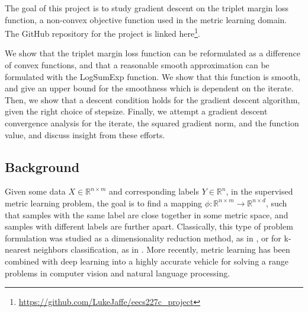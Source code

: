 \documentclass[11pt]{article}
\begin{document}
The goal of this project is to study gradient descent on the triplet margin loss function, a non-convex objective function used in the metric learning domain. The GitHub repository for the project is linked here\footnote{\url{https://github.com/LukeJaffe/eecs227c_project}}.

We show that the triplet margin loss function can be reformulated as a difference of convex functions, and that a reasonable smooth approximation can be formulated with the LogSumExp function. We show that this function is smooth, and give an upper bound for the smoothness which is dependent on the iterate. Then, we show that a descent condition holds for the gradient descent algorithm, given the right choice of stepsize. Finally, we attempt a gradient descent convergence analysis for the iterate, the squared gradient norm, and the function value, and discuss insight from these efforts.

\subsection{Background}
 
 Given some data $X \in \mathbb{R}^{n \times m}$ and corresponding labels $Y \in \mathbb{R}^n$, in the supervised metric learning problem, the goal is to find a mapping $\phi: \mathbb{R}^{n \times m} \rightarrow \mathbb{R}^{n \times d}$, such that samples with the same label are close together in some metric space, and samples with different labels are further apart. Classically, this type of problem formulation was studied as a dimensionality reduction method, as in \cite{hadsell_dimensionality_2006}, or for k-nearest neighbors classification, as in \cite{weinberger_distance_2009}. More recently, metric learning has been combined with deep learning into a highly accurate vehicle for solving a range problems in computer vision and natural language processing. 
 
\end{document}
